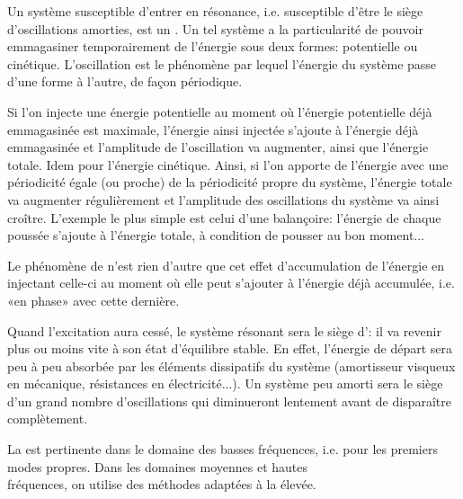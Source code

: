 \medskip
Un système susceptible d'entrer en résonance, i.e. susceptible d'être le siège d'oscillations amorties, est un . Un tel système a la particularité de pouvoir emmagasiner temporairement de l'énergie sous deux formes: potentielle ou cinétique. L'oscillation est le phénomène par lequel l'énergie du système passe d'une forme à l'autre, de façon périodique.

Si l'on injecte une énergie potentielle au moment où l'énergie potentielle déjà emmagasinée est maximale, l'énergie ainsi injectée s'ajoute à l'énergie déjà emmagasinée et l'amplitude de l'oscillation va augmenter, ainsi que l'énergie totale. Idem pour l'énergie cinétique. Ainsi, si l'on apporte de l'énergie avec une périodicité égale (ou proche) de la périodicité propre du système, l'énergie totale va augmenter régulièrement et l'amplitude des oscillations du système va ainsi croître. L'exemple le plus simple est celui d'une balançoire: l'énergie de chaque poussée s'ajoute à l'énergie totale, à condition de pousser au bon moment...

Le phénomène de  n'est rien d'autre que cet effet d'accumulation de l'énergie en injectant celle-ci au moment où elle peut s'ajouter à l'énergie déjà accumulée, i.e. «en phase» avec cette dernière.

\medskip
Quand l'excitation aura cessé, le système résonant sera le siège d': il va revenir plus ou moins vite à son état d'équilibre stable. En effet, l'énergie de départ sera peu à peu absorbée par les éléments dissipatifs du système (amortisseur visqueux en mécanique, résistances en électricité...). Un système peu amorti sera le siège d'un grand nombre d'oscillations qui diminueront lentement avant de disparaître complètement.

\medskip
La  est pertinente dans le domaine des basses fréquences, i.e. pour les premiers modes propres. Dans les domaines moyennes et hautes\\
 fréquences, on utilise des méthodes adaptées à la  élevée.

